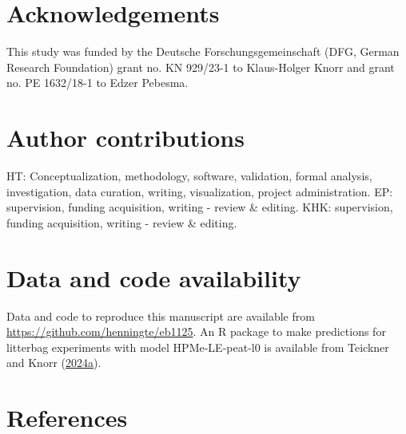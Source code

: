 \documentclass[
  12pt,
]{article}
\begin{document}
\hypertarget{acknowledgements}{%
\section*{Acknowledgements}\label{acknowledgements}}

This study was funded by the Deutsche Forschungsgemeinschaft (DFG, German Research Foundation) grant no. KN 929/23-1 to Klaus-Holger Knorr and grant no. PE 1632/18-1 to Edzer Pebesma.

\hypertarget{author-contributions}{%
\section*{Author contributions}\label{author-contributions}}

HT: Conceptualization, methodology, software, validation, formal analysis, investigation, data curation, writing, visualization, project administration. EP: supervision, funding acquisition, writing - review \& editing. KHK: supervision, funding acquisition, writing - review \& editing.

\hypertarget{data-and-code-availability}{%
\section*{Data and code availability}\label{data-and-code-availability}}

Data and code to reproduce this manuscript are available from \url{https://github.com/henningte/eb1125}. An R package to make predictions for litterbag experiments with model HPMe-LE-peat-l0 is available from Teickner and Knorr (\protect\hyperlink{ref-Teickner.2024b}{2024a}).

\hypertarget{references}{%
\section*{References}\label{references}}
\end{document}
